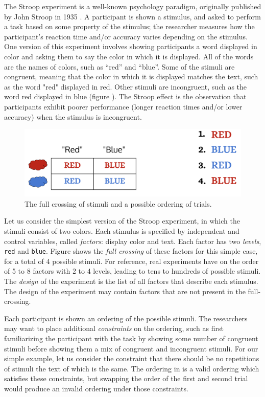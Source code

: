 The Stroop experiment is a well-known psychology paradigm, originally published by John Stroop in 1935 \cite{stroop1935studies}. A participant is shown a stimulus, and asked to perform a task based on some property of the stimulus; the researcher measures how the participant's reaction time and/or accuracy varies depending on the stimulus. One version of this experiment involves showing participants a word displayed in color and asking them to say the color in which it is displayed. All of the words are the names of colors, such as ``red'' and ``blue''. Some of the stimuli are congruent, meaning that the color in which it is displayed matches the text, such as the word "red" displayed in red. Other stimuli are incongruent, such as the word red displayed in blue (figure ). The Stroop effect is the observation that participants exhibit poorer performance (longer reaction times and/or lower accuracy) when the stimulus is incongruent. 

\begin{figure}[t]%
  \centerline{\includegraphics[origin=c,width=12cm]{fig_simple_full_crossing_and_seq}}
    \caption{The full crossing of stimuli and a possible ordering of trials.}%
    \label{fig:simple_full_crossing}%
\end{figure}

Let us consider the simplest version of the Stroop experiment, in which the stimuli consist of two colors. Each stimulus is specified by independent and control variables, called \emph{factors}: display color and text. Each factor has two \emph{levels}, \texttt{red} and \texttt{blue}. Figure  shows the \emph{full crossing} of these factors for this simple case, for a total of 4 possible stimuli. For reference, real experiments have on the order of 5 to 8 factors with 2 to 4 levels, leading to tens to hundreds of possible stimuli. The \emph{design} of the experiment is the list of all factors that describe each stimulus. The design of the experiment may contain factors that are not present in the full-crossing.

Each participant is shown an ordering of the possible stimuli. The researchers may want to place additional \emph{constraints} on the ordering, such as first familiarizing the participant with the task by showing some number of congruent stimuli before showing them a mix of congruent and incongruent stimuli. For our simple example, let us consider the constraint that there should be no repetitions of stimuli the text of which is the same. The ordering in  is a valid ordering which satisfies these constraints, but swapping the order of the first and second trial would produce an invalid ordering under those constraints.

